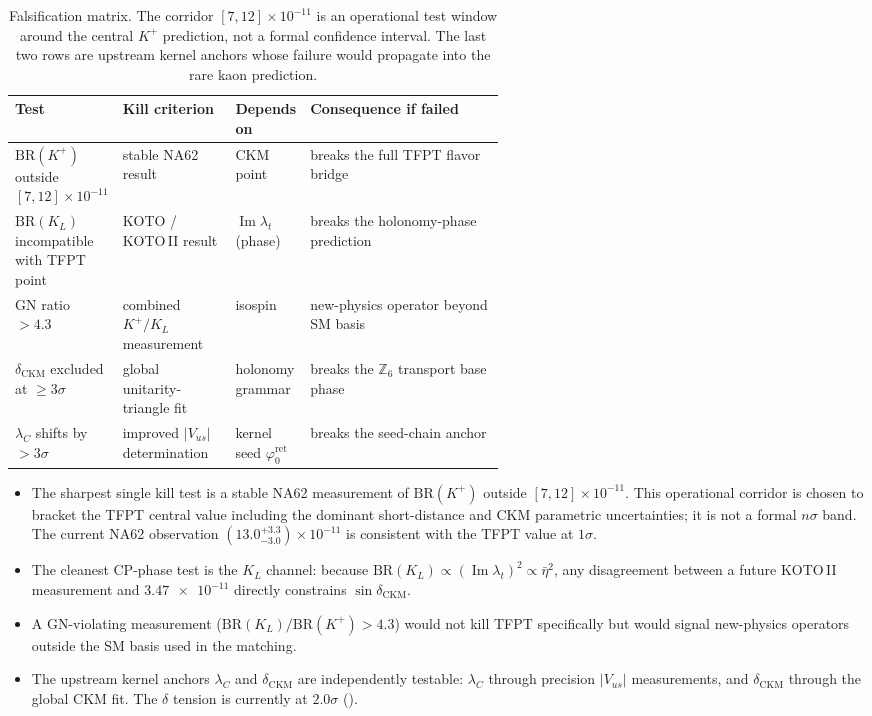 \documentclass[11pt,a4paper]{article}
\theoremstyle{definition}
\theoremstyle{remark}
\DeclareMathOperator{\im}{Im}
\newcommand{\phiz}{\varphi_{0}^{\mathrm{ret}}}
\newcommand{\BR}{\mathrm{BR}}
\numberwithin{equation}{section}
\begin{document}
\begin{table}[ht]
\centering
\small
\begin{tabularx}{\linewidth}{@{}>{\raggedright\arraybackslash}p{0.21\linewidth}>{\raggedright\arraybackslash}p{0.23\linewidth}>{\centering\arraybackslash}p{0.13\linewidth}>{\raggedright\arraybackslash}Y@{}}
\toprule
Test & Kill criterion & Depends on & Consequence if failed \\
\midrule
$\BR(K^+)$ outside $[7,12]\times 10^{-11}$
  & stable NA62 result
  & CKM point
  & breaks the full TFPT flavor bridge \\[4pt]
$\BR(K_L)$ incompatible with TFPT point
  & KOTO / KOTO\,II result
  & $\im\lambda_t$ (phase)
  & breaks the holonomy-phase prediction \\[4pt]
GN ratio $>4.3$
  & combined $K^+/K_L$ measurement
  & isospin
  & new-physics operator beyond SM basis \\[4pt]
$\delta_{\mathrm{CKM}}$ excluded at ${\ge}3\sigma$
  & global unitarity-triangle fit
  & holonomy grammar
  & breaks the $\mathbb Z_6$ transport base phase \\[4pt]
$\lambda_C$ shifts by $>3\sigma$
  & improved $|V_{us}|$ determination
  & kernel seed $\phiz$
  & breaks the seed-chain anchor \\
\bottomrule
\end{tabularx}
\caption{Falsification matrix. The corridor $[7,12]\times10^{-11}$
is an operational test window around the central $K^+$ prediction,
not a formal confidence interval.
The last two rows are upstream kernel anchors whose failure would
propagate into the rare kaon prediction.}
\label{tab:falsification}
\end{table}

\begin{itemize}[leftmargin=1.6em, itemsep=0.3em]
\item The sharpest single kill test is a stable NA62 measurement of
$\BR(K^+)$ outside $[7,12]\times 10^{-11}$. This operational corridor
is chosen to bracket the TFPT central value including the dominant
short-distance and CKM parametric uncertainties; it is not a formal
$n\sigma$ band.
The current NA62 observation $(13.0^{+3.3}_{-3.0})\times 10^{-11}$
is consistent with the TFPT value at $1\sigma$.
\item The cleanest CP-phase test is the $K_L$ channel: because
$\BR(K_L)\propto(\im\lambda_t)^2\propto\bar\eta^2$, any
disagreement between a future KOTO\,II measurement and
$\num{3.47e-11}$ directly constrains $\sin\delta_{\mathrm{CKM}}$.
\item A GN-violating measurement ($\BR(K_L)/\BR(K^+)>4.3$) would not
kill TFPT specifically but would signal new-physics operators outside
the SM basis used in the matching.
\item The upstream kernel anchors $\lambda_C$ and $\delta_{\mathrm{CKM}}$
are independently testable: $\lambda_C$ through precision $|V_{us}|$
measurements, and $\delta_{\mathrm{CKM}}$ through the global CKM fit.
The $\delta$ tension is currently at $2.0\sigma$ ().
\end{itemize}
\end{document}
